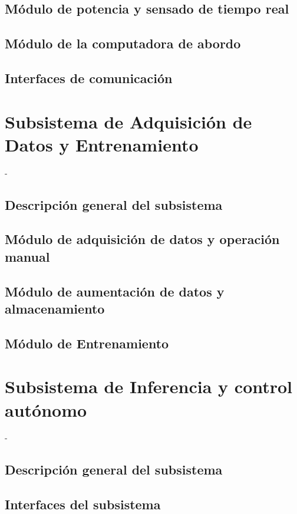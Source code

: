     \subsection{Módulo de potencia y sensado de tiempo real}

    \subsection{Módulo de la computadora de abordo}

    \subsection{Interfaces de comunicación}
    

\section{Subsistema de Adquisición de Datos y Entrenamiento}
    -
    \subsection{Descripción general del subsistema}
    
    \subsection{Módulo de adquisición de datos y operación manual}
    
    \subsection{Módulo de aumentación de datos y almacenamiento}
    
    \subsection{Módulo de Entrenamiento}
    
\section{Subsistema de Inferencia y control autónomo}
-
    \subsection{Descripción general del subsistema}
    \subsection{Interfaces del subsistema}
